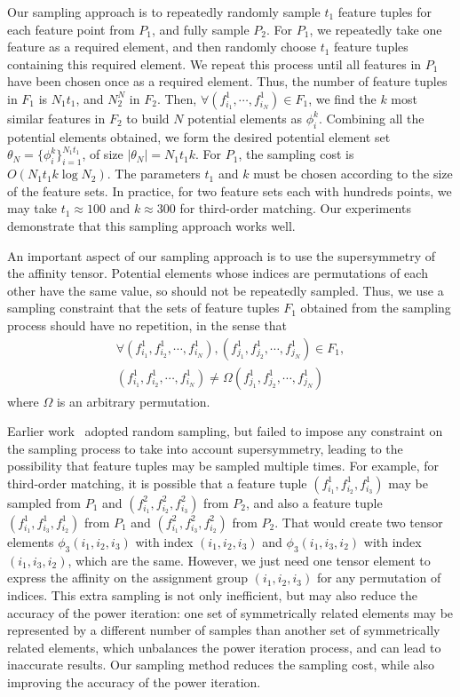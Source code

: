 Our sampling approach is to repeatedly randomly sample $t_1$ feature tuples for each feature point from $P_1$, and fully sample $P_2$.
For $P_1$, we repeatedly take one feature as a required element, and then randomly choose $t_1$ feature tuples containing this required element.
We repeat this process until all features in $P_1$ have been chosen once as a required element.
Thus, the number of feature tuples in $F_1$ is $N_1t_1$, and $N_2^N$ in $F_2$.
Then, $\forall (f_{i_1}^1, \cdots, f_{i_N}^1)\in F_1$, we find the $k$ most similar features in $F_2$ to build $N$ potential elements as $\phi_i^k$.
Combining all the potential elements obtained, we form the desired potential element set $\theta_N = \{\phi_i^k\}_{i=1}^{N_1 t_1}$, of size $|\theta_N| = N_1 t_1 k$.
For $P_1$, the sampling cost is $O(N_1  t_1 k \log N_2)$.
The parameters $t_1$ and $k$ must be chosen according to the size of the feature sets.
In practice, for two feature sets each with hundreds points,
we may take $t_1 \approx 100$ and $k\approx300$ for third-order matching.
Our experiments demonstrate that this sampling approach works well.

An important aspect of our sampling approach is to use the supersymmetry of the affinity tensor. Potential elements whose indices are permutations of each other
have the same value, so should not be repeatedly sampled.
Thus, we use a sampling constraint that the sets of feature tuples $F_1$ obtained from the sampling process should have no repetition, in the sense that
\begin{eqnarray}
\label{equ:noredun2}
\forall (f_{i_1}^1,f_{i_2}^1,\cdots,f_{i_N}^1),(f_{j_1}^1,f_{j_2}^1,\cdots,f_{j_N}^1) \in F_1,\nonumber\\ (f_{i_1}^1,f_{i_2}^1,\cdots,f_{i_N}^1)\neq\Omega(f_{j_1}^1,f_{j_2}^1,\cdots,f_{j_N}^1)
\end{eqnarray}
where $\Omega$ is an arbitrary permutation.

Earlier work~\cite{Zass08,Duchenne09,Aiping10} adopted random sampling,
but failed to impose any constraint on the sampling process to take into account supersymmetry,
leading to the possibility that feature tuples may be sampled multiple times.
For example, for third-order matching, it is possible that a feature tuple $(f_{i_1}^1, f_{i_2}^1, f_{i_3}^1)$ may be sampled from $P_1$ and $(f_{i_1}^2, f_{i_2}^2, f_{i_3}^2)$ from $P_2$,
and also a feature tuple $(f_{i_1}^1, f_{i_3}^1, f_{i_2}^1)$  from $P_1$ and $(f_{i_1}^2, f_{i_3}^2, f_{i_2}^2)$ from $P_2$. That would create two tensor elements $\phi_3({i_1}, {i_2}, {i_3})$ with index $({i_1}, {i_2}, {i_3})$ and $\phi_3({i_1}, {i_3}, {i_2})$ with index $({i_1}, {i_3}, {i_2})$, which are the same. However, we just need one tensor element to express the affinity on the assignment group $({i_1}, {i_2}, {i_3})$ for any permutation of indices.
This extra sampling is not only inefficient, but may also reduce the accuracy of the power iteration: one set of symmetrically related elements  may be represented by a different number of samples than another set of  symmetrically related elements, which unbalances the power iteration process, and can lead to inaccurate results.
Our sampling method reduces the sampling cost, while also improving the accuracy of the power iteration.
